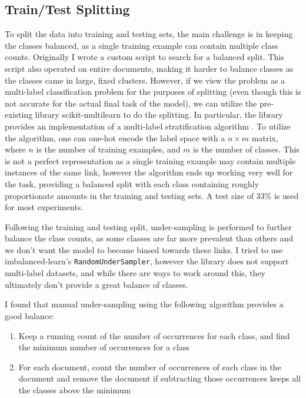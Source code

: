 \documentclass[manuscript,screen,review]{acmart}
\begin{document}
\subsection*{Train/Test Splitting}
\label{sec:org713ba6f}

To split the data into training and testing sets, the main challenge
is in keeping the classes balanced, as a single training example can
contain multiple class counts. Originally I wrote a custom script to
search for a balanced split. This script also operated on entire
documents, making it harder to balance classes as the classes came in
large, fixed clusters. However, if we view the problem as a
multi-label classification problem for the purposes of splitting (even
though this is not accurate for the actual final task of the model),
we can utilize the pre-existing library scikit-multilearn
\citep{skmultilearn} to do the splitting. In particular, the library
provides an implementation of a multi-label stratification algorithm
\citep{multilabelstrat2,multilabelstrat1}. To utilize the algorithm,
one can one-hot encode the label space with a \(n \times m\) matrix, where
\(n\) is the number of training examples, and \(m\) is the number of
classes. This is not a perfect representation as a single training
example may contain multiple instances of the same link, however the
algorithm ends up working very well for the task, providing a balanced
split with each class containing roughly proportionate amounts in the
training and testing sets. A test size of 33\% is used for most
experiments.

Following the training and testing split, under-sampling is performed
to further balance the class counts, as some classes are far more
prevalent than others and we don't want the model to become biased
towards these links. I tried to use imbalanced-learn's
\citep{imbalanced-learn} \texttt{RandomUnderSampler}, however the library does
not support multi-label datasets, and while there are ways to work
around this, they ultimately don't provide a great balance of classes.

I found that manual under-sampling using the following algorithm
provides a good balance:

\begin{enumerate}
\item Keep a running count of the number of occurrences for each class,
and find the minimum number of occurrences for a class
\item For each document, count the number of occurrences of each class in
the document and remove the document if subtracting those
occurrences keeps all the classes above the minimum
\end{enumerate}
\end{document}
